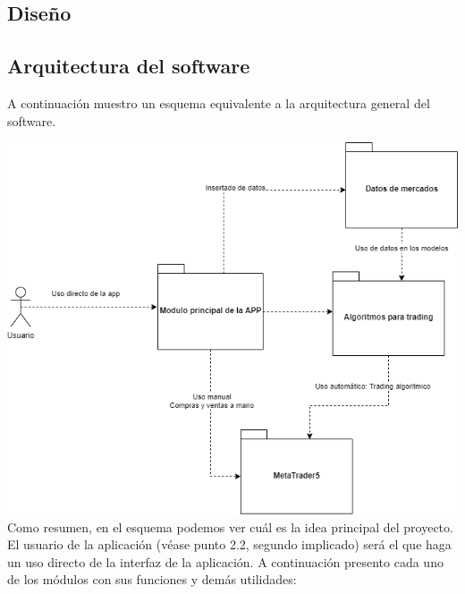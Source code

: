 \begin{titlepage}

\chapter{Diseño}


\section{Arquitectura del software}

A continuación muestro un esquema equivalente a la arquitectura general del software.\newline

\includegraphics[width=1\textwidth]{imagenes/arquitectura general.png}\\[0.1cm]

Como resumen, en el esquema podemos ver cuál es la idea principal del proyecto. El usuario de la aplicación (véase punto 2.2, segundo implicado) será el que haga un uso directo de la interfaz de la aplicación. A continuación presento cada uno de los módulos con sus funciones y demás utilidades:


\end{titlepage}
